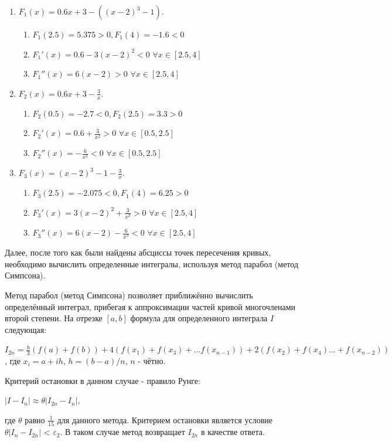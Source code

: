 \documentclass[a4paper,12pt,titlepage,finall]{article}
\begin{document}
\begin{enumerate}
\item {$F_1(x) = 0.6x + 3 - ((x-2)^3 - 1)$}.
\begin{enumerate}
\item {$F_1(2.5) = 5.375 > 0, F_1(4) = -1.6 < 0$}
\item {$F_1'(x) = 0.6 - 3(x-2)^2 < 0$} {$\forall{x} \in [2.5, 4]$}
\item {$F_1''(x) = 6(x - 2) > 0 $} {$\forall{x} \in [2.5, 4] $}
\end{enumerate}\par

\item {$F_2(x) = 0.6x + 3 - \frac{3}{x}$}.

\begin{enumerate}
\item {$F_2(0.5) = -2.7 < 0, F_2(2.5) = 3.3 > 0$}
\item {$F_2'(x) = 0.6 + \frac{3}{x^2} > 0$} {$\forall{x} \in [0.5, 2.5]$}
\item {$F_2''(x) = -\frac{6}{x^3} < 0 $} {$\forall{x} \in [0.5, 2.5] $}
\end{enumerate}\par

\item {$F_3(x) = (x-2)^3 - 1 - \frac{3}{x}$}.
\begin{enumerate}
\item {$F_3(2.5) = -2.075 < 0, F_1(4) = 6.25 > 0$}
\item {$F_3'(x) = 3(x-2)^2 + \frac{3}{x^2} > 0$} {$\forall{x} \in [2.5, 4]$}
\item {$F_3''(x) = 6(x-2) - \frac{6}{x^3} < 0 $} {$\forall{x} \in [2.5, 4]$}
\end{enumerate}\par
\end{enumerate}\par
Далее, после того как были найдены абсциссы точек пересечения кривых, необходимо вычислить определенные интегралы, используя метод парабол (метод Симпсона).\par

Метод парабол (метод Симпсона) позволяет приближённо вычислить определённый интеграл, прибегая к аппроксимации частей кривой многочленами второй степени.\cite{math} На отрезке {$[a, b]$} формула для определенного интеграла {$I$} следующая: \\\par
\begin{center}
    {$I_{2n} = \frac{h}{3}(f(a) + f(b)) + 4(f(x_1) + f(x_3) +... f(x_{n - 1})) + 2(f(x_2) + f(x_4) ... + f(x_{n-2}))$}, где {$x_i = a + ih$}, {$h = (b - a) / n$}, $n$ - чётно.
\end{center}
Критерий остановки в данном случае - правило Рунге:
\begin{center}
    $|I - I_n| \approx \theta|I_{2n} - I_n|$,
\end{center}
где $\theta$ равно $\frac{1}{15}$ для данного метода. Критерием остановки является условие $\theta|I_n - I_{2n}|$ < $\varepsilon_2$. В таком случае метод возвращает $I_{2n}$ в качестве ответа. \cite{prog}
\end{document}

